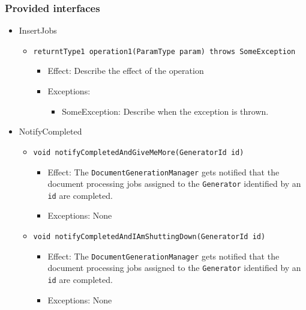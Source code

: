 \documentclass[a4paper,10pt]{article}
\begin{document}
\subsubsection*{Provided interfaces}
\begin{itemize}
    \item InsertJobs
    \begin{itemize}
        \item \texttt{returntType1 operation1(ParamType param) throws SomeException}
        \begin{itemize}
            \item Effect: Describe the effect of the operation
            \item Exceptions:
            \begin{itemize}
                \item SomeException: Describe when the exception is thrown.
            \end{itemize}
        \end{itemize}
    \end{itemize}

    \item NotifyCompleted
    \begin{itemize}
        \item \texttt{void notifyCompletedAndGiveMeMore(GeneratorId id)}
        \begin{itemize}
            \item Effect: The \texttt{DocumentGenerationManager} gets notified that the document processing jobs assigned to the \texttt{Generator} identified by an \texttt{id} are completed. 
            \item Exceptions: None
        \end{itemize}
        
        \item \texttt{void notifyCompletedAndIAmShuttingDown(GeneratorId id)}
        \begin{itemize}
            \item Effect: The \texttt{DocumentGenerationManager} gets notified that the document processing jobs assigned to the \texttt{Generator} identified by an \texttt{id} are completed. 
            \item Exceptions: None
        \end{itemize}
    \end{itemize}
\end{itemize}
\end{document}
